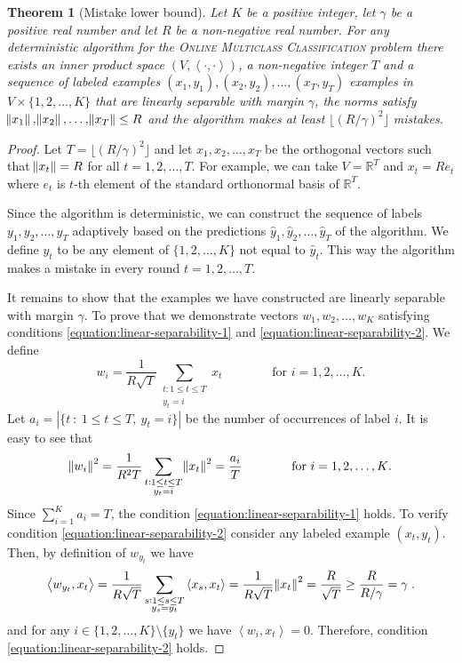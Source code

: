 \documentclass[12pt]{article}
\newtheorem{theorem}[definition]{Theorem}
\newcommand{\R}{\mathbb{R}}  %
\newcommand{\ip}[2]{\left\langle #1, #2 \right\rangle} %
\begin{document}
\begin{theorem}[Mistake lower bound]
\label{theorem:online-multiclass-classification-mistake-lower-bound}
Let $K$ be a positive integer, let $\gamma$ be a positive real number and let
$R$ be a non-negative real number. For any deterministic algorithm for the
\textsc{Online Multiclass Classification} problem there exists an
inner product space $(V, \ip{\cdot}{\cdot})$, a non-negative integer $T$ and a
sequence of labeled examples $(x_1, y_1), (x_2, y_2), \dots, (x_T, y_T)$
examples in $V \times \{1,2,\dots,K\}$ that are linearly separable with margin
$\gamma$, the norms satisfy $\norm{x_1}, \norm{x_2}, \dots, \norm{x_T} \le R$
and the algorithm makes at least $\lfloor (R/\gamma)^2 \rfloor$ mistakes.
\end{theorem}

\begin{proof}
Let $T = \lfloor (R/\gamma)^2 \rfloor$ and let $x_1, x_2, \dots, x_T$ be the
orthogonal vectors such that $\norm{x_t} = R$ for all $t=1,2,\dots,T$. For
example, we can take $V = \R^T$ and $x_t = R e_t$ where $e_t$ is $t$-th element
of the standard orthonormal basis of $\R^T$.

Since the algorithm is deterministic, we can construct the sequence of labels
$y_1, y_2, \dots, y_T$ adaptively based on the predictions $\widehat y_1,
\widehat y_2, \dots, \widehat y_T$ of the algorithm. We define $y_t$ to be any
element of $\{1,2,\dots,K\}$ not equal to $\widehat y_t$. This way the algorithm
makes a mistake in every round $t=1,2,\dots,T$.

It remains to show that the examples we have constructed are linearly separable
with margin $\gamma$. To prove that we demonstrate vectors $w_1, w_2, \dots, w_K$
satisfying conditions \eqref{equation:linear-separability-1} and
\eqref{equation:linear-separability-2}. We define
$$
w_i = \frac{1}{R\sqrt{T}} \sum_{\substack{t : 1 \le t \le T \\ y_t = i}} x_t \qquad \qquad \text{for $i=1,2,\dots,K$.}
$$
Let $a_i = |\{ t ~:~ 1 \le t \le T, \ y_t = i \}|$ be the number of occurrences of label $i$.
It is easy to see that
$$
\norm{w_i}^2 = \frac{1}{R^2 T} \sum_{\substack{t : 1 \le t \le T \\ y_t = i}} \norm{x_t}^2 = \frac{a_i}{T} \qquad \qquad \text{for $i=1,2,\dots,K$.}
$$
Since $\sum_{i=1}^K a_i = T$, the condition
\eqref{equation:linear-separability-1} holds. To verify condition
\eqref{equation:linear-separability-2} consider any labeled example $(x_t,
y_t)$. Then, by definition of $w_{y_t}$ we have
$$
\ip{w_{y_t}}{x_t}
= \frac{1}{R\sqrt{T}} \sum_{\substack{s : 1 \le s \le T \\ y_s = y_t}} \ip{x_s}{x_t}
= \frac{1}{R\sqrt{T}} \norm{x_t}^2
= \frac{R}{\sqrt{T}}
\ge \frac{R}{R/\gamma}
= \gamma \; .
$$
and for any $i \in \{1,2,\dots,K\} \setminus \{y_t\}$ we have
$\ip{w_i}{x_t} = 0$. Therefore, condition \eqref{equation:linear-separability-2} holds.
\end{proof}
\end{document}
